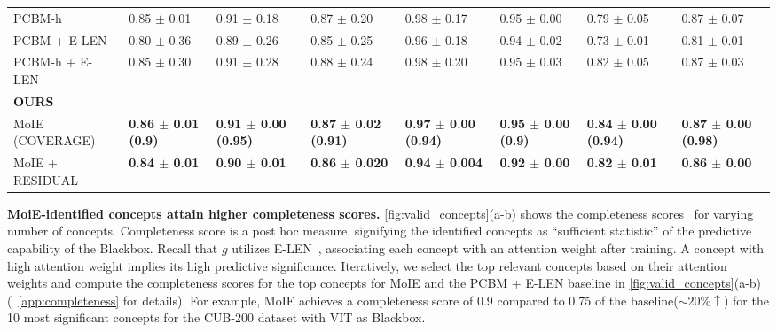 \begin{table*}[t]
\begin{center}
\begin{tabular}{p{25.5em} p{7.5em} p{7.5em} p{7.5em} p{7.5em} p{7.5em} p{7.5em} p{7.5em}}
     PCBM-h~\cite{yuksekgonul2022post} & 0.85 $\pm$ 0.01  & 0.91 $\pm$ 0.18 & 0.87 $\pm$ 0.20 & 0.98 $\pm$ 0.17 &
     0.95 $\pm$	0.00 & 0.79 $\pm$	0.05 & 0.87 $\pm$	0.07\\
     PCBM + E-LEN~\cite{yuksekgonul2022post, barbiero2022entropy} &  0.80 $\pm$ 0.36 & 0.89 $\pm$ 0.26 & 0.85 $\pm$ 0.25 & 0.96 $\pm$ 0.18 & 
     0.94 $\pm$	0.02 &  0.73 $\pm$	0.01 & 0.81 $\pm$	0.01\\
     PCBM-h + E-LEN~\cite{yuksekgonul2022post, barbiero2022entropy} &  0.85 $\pm$ 0.30 & 0.91 $\pm$ 0.28 & 0.88 $\pm$ 0.24 & 0.98 $\pm$ 0.20 & 
     0.95 $\pm$	0.03 &  0.82 $\pm$	0.05 & 0.87 $\pm$	0.03\\
\midrule
     \textbf{OURS} \\
     MoIE (COVERAGE) &\textbf{0.86 $\pm$ 0.01 (0.9)} &\textbf{0.91 $\pm$ 0.00 (0.95)} &
     \textbf{0.87 $\pm$ 0.02 (0.91)} & \textbf{0.97 $\pm$ 0.00 (0.94)} & \textbf{0.95 $\pm$	0.00 (0.9)}
     & \textbf{0.84 $\pm$ 0.00 (0.94)} & \textbf{0.87 $\pm$	0.00 (0.98)}\\
     MoIE + RESIDUAL & \textbf{0.84 $\pm$ 0.01} & \textbf{0.90 $\pm$ 0.01} & \textbf{0.86 $\pm$ 0.020} & \textbf{0.94 $\pm$ 0.004}
     & \textbf{0.92 $\pm$	0.00} & \textbf{0.82 $\pm$	0.01} & \textbf{0.86 $\pm$	0.00} \\
\bottomrule
\end{tabular}
\end{center}
\end{table*}

\textbf{MoiE-identified concepts attain higher completeness scores.} 
\cref{fig:valid_concepts}(a-b) shows the completeness scores~\cite{yeh2019concept} for varying number of concepts.
 Completeness score is a post hoc measure, signifying the identified concepts as ``sufficient statistic'' of the predictive capability of the Blackbox. Recall that $g$ utilizes E-LEN~\cite{barbiero2022entropy}, associating each concept with an attention weight after training. A concept with high attention weight implies its high predictive significance.
 Iteratively, we select the top relevant concepts based on their attention weights and compute the completeness scores for the top concepts for MoIE and the PCBM + E-LEN baseline in \cref{fig:valid_concepts}(a-b) (~\cref{app:completeness} for details).
 For example, MoIE achieves a completeness score of 0.9 compared to 0.75 of the baseline($\sim 20\%\uparrow$) for the 10 most significant concepts for the CUB-200 dataset with VIT as Blackbox.
 
